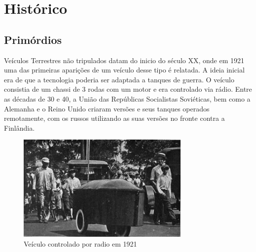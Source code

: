 \chapter{Histórico}
\label{cap:historico}
\section{Primórdios}
Veículos Terrestres não tripulados datam do inicio do século XX, onde em 1921 uma das primeiras aparições de um veículo desse tipo é relatada. A ideia inicial era de que a tecnologia poderia ser adaptada a tanques de guerra. O veículo consistia de um chassi de 3 rodas com um motor e era controlado via rádio. Entre as décadas de 30 e 40, a União das Repúblicas Socialistas Soviéticas, bem como a Alemanha e o Reino Unido criaram versões e seus tanques operados remotamente, com os russos utilizando as suas versões no fronte contra a Finlândia.
\begin{figure}[!htb]
    \centering
    \includegraphics[width=0.75\textwidth]{figuras/controaldo_1921.jpg}
    \caption{Veículo controlado por radio em 1921}
    \label{fig:veiculo:1921}
\end{figure}

